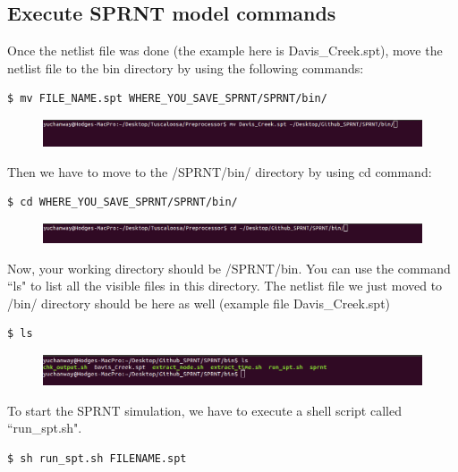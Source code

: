 \documentclass[12pt, letterpaper]{article}
\begin{document}
\subsection{Execute SPRNT model commands}
\begin{flushleft} %

Once the netlist file was done (the example here is Davis\_Creek.spt), move the netlist file to the bin directory by using the following commands:
\begin{lstlisting}[frame=single]
$ mv FILE_NAME.spt WHERE_YOU_SAVE_SPRNT/SPRNT/bin/
\end{lstlisting}
\begin{figure}[H]
	\centering
	\includegraphics[width = 1.0\textwidth]{figure/mv_to_bin.png} %
	\label{fig:process}%
\end{figure}

Then we have to move to the /SPRNT/bin/ directory by using cd command:

\begin{lstlisting}[frame=single]
$ cd WHERE_YOU_SAVE_SPRNT/SPRNT/bin/
\end{lstlisting}
\begin{figure}[H]
	\centering
	\includegraphics[width = 1.0\textwidth]{figure/cd_to_bin.png} %
	\label{fig:process}%
\end{figure}

Now, your working directory should be /SPRNT/bin. You can use the command ``ls" to list all the visible files in this directory.
The netlist file we just moved to /bin/ directory should be here as well (example file Davis\_Creek.spt)

\begin{lstlisting}[frame=single]
$ ls
\end{lstlisting}
\begin{figure}[H]
	\centering
	\includegraphics[width = 1.0\textwidth]{figure/ls_in_bin.png} %
	\label{fig:process}%
\end{figure}


To start the SPRNT simulation, we have to execute a shell script called ``run\_spt.sh".
\begin{lstlisting}[frame=single]
$ sh run_spt.sh FILENAME.spt
\end{lstlisting}


\end{flushleft}
\end{document}
